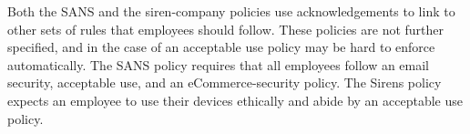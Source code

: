\documentclass{llncs}
\newenvironment{policyrule}[1]{%
  \begin{mdframed}\footnotesize
      \noindent\textbf{\sffamily #1}:~\itshape%
}{%
  \end{mdframed}
}
\begin{document}

Both the SANS and the siren-company policies use acknowledgements to link to other sets of rules that employees should follow.
These policies are not further specified, and in the case of an acceptable use policy may be hard to enforce automatically.
The SANS policy requires that all employees follow an email security, acceptable use, and an eCommerce-security policy.
The Sirens policy expects an employee to use their devices ethically and abide by an acceptable use policy.
\end{document}
